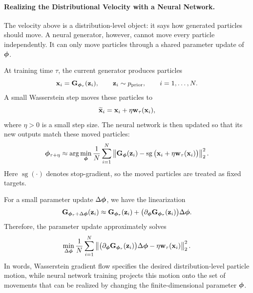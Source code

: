\paragraph{Realizing the Distributional Velocity with a Neural Network.}
The velocity above is a distribution-level object: it says how generated
particles should move.  A neural generator, however, cannot move every particle
independently.  It can only move particles through a shared parameter update of
${\bm{\phi}}$.

At training time $\tau$, the current generator produces particles
\[
    {\mathbf{x}}_i
    =
    {\mathbf{G}}_{{\bm{\phi}}_\tau}({\mathbf{z}}_i),
    \qquad
    {\mathbf{z}}_i\sim p_{\mathrm{prior}},
    \qquad
    i=1,\ldots,N.
\]
A small Wasserstein step moves these particles to
\[
    \widetilde{{\mathbf{x}}}_i
    =
    {\mathbf{x}}_i+\eta{\mathbf{w}}_\tau({\mathbf{x}}_i),
\]
where $\eta>0$ is a small step size.  The neural network is then updated so
that its new outputs match these moved particles:
\[
    {\bm{\phi}}_{\tau+\eta}
    \approx
    \arg\min_{{\bm{\phi}}}
    \frac{1}{N}
    \sum_{i=1}^N
    \left\|
        {\mathbf{G}}_{{\bm{\phi}}}({\mathbf{z}}_i)
        -
        \operatorname{sg}
        \big(
            {\mathbf{x}}_i+\eta{\mathbf{w}}_\tau({\mathbf{x}}_i)
        \big)
    \right\|_2^2.
\]
Here $\operatorname{sg}(\cdot)$ denotes stop-gradient, so the moved particles
are treated as fixed targets.

For a small parameter update $\Delta{\bm{\phi}}$, we have the linearization
\[
    {\mathbf{G}}_{{\bm{\phi}}_\tau+\Delta{\bm{\phi}}}({\mathbf{z}}_i)
    \approx
    {\mathbf{G}}_{{\bm{\phi}}_\tau}({\mathbf{z}}_i)
    +
    \big(\partial_{{\bm{\phi}}}{\mathbf{G}}_{{\bm{\phi}}_\tau}({\mathbf{z}}_i)\big)\Delta{\bm{\phi}}.
\]
Therefore, the parameter update approximately solves
\[
    \min_{\Delta{\bm{\phi}}}
    \frac{1}{N}
    \sum_{i=1}^N
    \left\|
        \big(\partial_{{\bm{\phi}}}{\mathbf{G}}_{{\bm{\phi}}_\tau}({\mathbf{z}}_i)\big)\Delta{\bm{\phi}}
        -
        \eta{\mathbf{w}}_\tau({\mathbf{x}}_i)
    \right\|_2^2.
\]
In words, Wasserstein gradient flow specifies the desired distribution-level
particle motion, while neural network training projects this motion onto the
set of movements that can be realized by changing the finite-dimensional
parameter ${\bm{\phi}}$.

